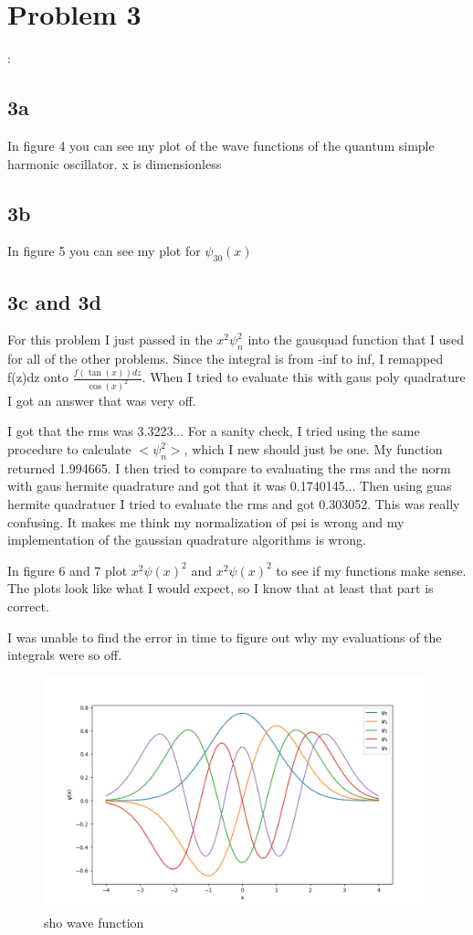 \documentclass{article}
\begin{document}
\section{Problem 3}:
\subsection{3a}

In figure 4 you can see my plot of the wave functions of the quantum simple harmonic oscillator. x is dimensionless
\subsection{3b}
In figure 5 you can see my plot for $\psi_{30}(x)$

\subsection{3c and 3d}
\par 
For this problem I just passed in the $x^2\psi_n^2$ into the gausquad function that I used for all of the other problems. Since the integral is from -inf to inf, I remapped f(z)dz onto $\frac{f(\tan(x))dz}{\cos(x)^2}$. When I tried to evaluate this with gaus poly quadrature I got an answer that was very off. 
\par
I got that the rms was 3.3223... For a sanity check, I tried using the same procedure to calculate  $<\psi_n^2>$, which I new should just be one. My function returned 1.994665. I then tried to compare to evaluating the rms and the norm with gaus hermite quadrature and got that it was 0.1740145... Then using guas hermite quadratuer I tried to evaluate the rms and got 0.303052. This was really confusing. It makes me think my normalization of psi is wrong and my implementation of the gaussian quadrature algorithms is wrong.
\par
In figure 6 and 7 plot $x^2\psi(x)^2$ and $x^2\psi(x)^2$ to see if my functions make sense. The plots look like what I would expect, so I know that at least that part is correct. 
\par I was unable to find the error in time to figure out why my evaluations of the integrals were so off.



\begin{figure}
    \centering
    \includegraphics[width=\linewidth]{psi_1-4.png}
    \caption{sho wave function }
    \label{}
\end{figure}
\end{document}

